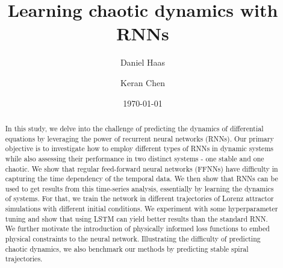 \documentclass[a4paper, amsfonts, amssymb, amsmath, reprint, showkeys, nofootinbib, twoside, floatfix]{revtex4-2}
\begin{document}


\title{Learning chaotic dynamics with RNNs}
\author{Daniel Haas}
\author{Keran Chen}
\date{\today} %

\newcommand{\kc}[1]{\textcolor{green}{#1 $\mathcal{K}$}}
\newcommand{\dan}[1]{\textcolor{red}{#1 $\mathcal{D}$}}
\renewcommand{\eqref}[1]{Eq. (\ref{#1})}
\newcommand{\tabref}[1]{Tab. (\ref{#1})}
\newcommand{\figref}[1]{Fig. (\ref{#1})}


\begin{abstract}
 In this study, we delve into the challenge of predicting the dynamics of differential equations by leveraging the power of recurrent neural networks (RNNs). Our primary objective is to investigate how to employ different types of RNNs in dynamic systems while also assessing their performance in two distinct systems - one stable and one chaotic. We show that regular feed-forward neural networks (FFNNs) have difficulty in capturing the time dependency of the temporal data. We then show that RNNs can be used to get results from this time-series analysis, essentially by learning the dynamics of systems. For that, we train the network in different trajectories of Lorenz attractor simulations with different initial conditions.  We experiment with some hyperparameter tuning and show that using LSTM can yield better results than the standard RNN. We further motivate the introduction of physically informed loss functions to embed physical constraints to the neural network. Illustrating the difficulty of predicting chaotic dynamics, we also benchmark our methods by predicting stable spiral trajectories.
\end{abstract}


\maketitle

\twocolumngrid
  






\onecolumngrid



%
\end{document}
